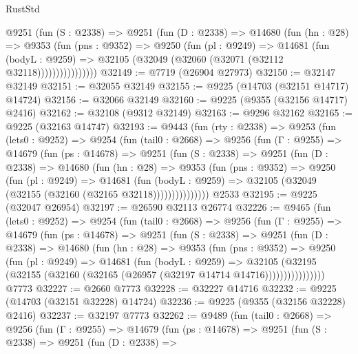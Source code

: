 \begin{lexlean}{RustStd}
\begin{coremodule}
              @9251
                (fun (S : @2338) =>
                @9251
                  (fun (D : @2338) =>
                  @14680
                    (fun (hn : @28) =>
                    @9353
                      (fun (pns : @9352) =>
                      @9250
                        (fun (pl : @9249) =>
                        @14681
                          (fun (bodyL : @9259) =>
                          @32105 (@32049 (@32060 (@32071 (@32112 @32118))))))))))))))))
@32149 := @7719 (@26904 @27973)
@32150 := @32147 @32149
@32151 := @32055 @32149
@32155 := @9225 (@14703 (@32151 @14717) @14724)
@32156 := @32066 @32149
@32160 := @9225 (@9355 (@32156 @14717) @2416)
@32162 := @32108 (@9312 @32149)
@32163 := @9296 @32162
@32165 := @9225 (@32163 @14747)
@32193 := @9443
    (fun (rty : @2338) =>
    @9253
      (fun (lets0 : @9252) =>
      @9254
        (fun (tail0 : @2668) =>
        @9256
          (fun (Γ : @9255) =>
          @14679
            (fun (ps : @14678) =>
            @9251
              (fun (S : @2338) =>
              @9251
                (fun (D : @2338) =>
                @14680
                  (fun (hn : @28) =>
                  @9353
                    (fun (pns : @9352) =>
                    @9250
                      (fun (pl : @9249) =>
                      @14681
                        (fun (bodyL : @9259) =>
                        @32105 (@32049 (@32155 (@32160 (@32165 @32118)))))))))))))))
    @2533
@32195 := @9225 (@32047 @26954)
@32197 := @26590 @32113 @26774
@32226 := @9465
    (fun (lets0 : @9252) =>
    @9254
      (fun (tail0 : @2668) =>
      @9256
        (fun (Γ : @9255) =>
        @14679
          (fun (ps : @14678) =>
          @9251
            (fun (S : @2338) =>
            @9251
              (fun (D : @2338) =>
              @14680
                (fun (hn : @28) =>
                @9353
                  (fun (pns : @9352) =>
                  @9250
                    (fun (pl : @9249) =>
                    @14681
                      (fun (bodyL : @9259) =>
                      @32105
                        (@32195
                          (@32155 (@32160 (@32165 (@26957 (@32197 @14714 @14716))))))))))))))))
    @7773
@32227 := @2660 @7773
@32228 := @32227 @14716
@32232 := @9225 (@14703 (@32151 @32228) @14724)
@32236 := @9225 (@9355 (@32156 @32228) @2416)
@32237 := @32197 @7773
@32262 := @9489
    (fun (tail0 : @2668) =>
    @9256
      (fun (Γ : @9255) =>
      @14679
        (fun (ps : @14678) =>
        @9251
          (fun (S : @2338) =>
          @9251
            (fun (D : @2338) =>

\end{coremodule}
\end{lexlean}

